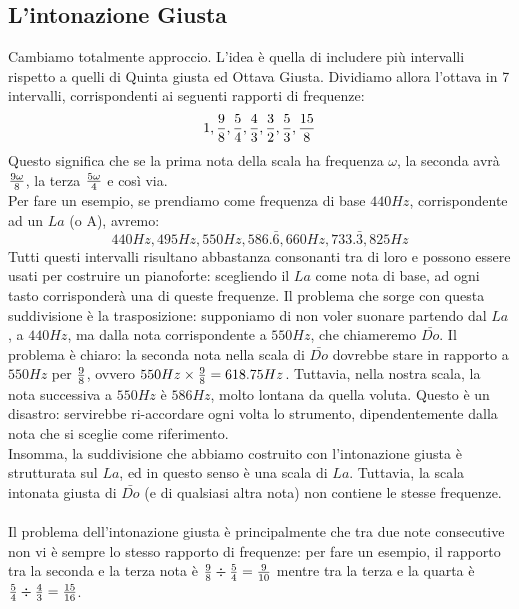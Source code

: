 \documentclass[12pt,a4paper]{report}
\theoremstyle{definition}
\theoremstyle{Theorem}
\theoremstyle{definition}
\theoremstyle{definition}
\theoremstyle{definition}
\begin{document}
	 \subsection{L'intonazione Giusta}
	 Cambiamo totalmente approccio. L'idea è quella di includere più intervalli rispetto a quelli di Quinta giusta ed Ottava Giusta. Dividiamo allora l'ottava in 7 intervalli, corrispondenti ai seguenti rapporti di frequenze:
	 $$1,{9\over8},{5\over4},{4\over3},{3\over 2},{5\over3},{15\over8}$$
	 Questo significa che se la prima nota della scala ha frequenza $\omega$, la seconda avrà $9\omega\over8$, la terza ${5\omega\over 4}$ e così via.\\
	 Per fare un esempio, se prendiamo come frequenza di base $440 Hz$, corrispondente ad un $La$ (o A), avremo:
	 $$440 Hz,495 Hz,550 Hz, 586.\bar{6},660 Hz,733.\bar{3},825 Hz$$
	 Tutti questi intervalli risultano abbastanza consonanti tra di loro e possono essere usati per costruire un pianoforte: scegliendo il $La$  come nota di base, ad ogni tasto corrisponderà una di queste frequenze.
	 Il problema che sorge con questa suddivisione è la trasposizione: supponiamo di non voler suonare partendo dal $La$, a $440 Hz$, ma dalla nota corrispondente a $550 Hz$, che chiameremo $\bar{Do}$. Il problema è chiaro: la seconda nota nella scala di $\bar{Do}$ dovrebbe stare in rapporto a $550 Hz$ per $9\over 8$, ovvero $550Hz\times {9\over 8}=618.75Hz$. Tuttavia, nella nostra scala, la nota successiva a $550 Hz$ è $586 Hz$, molto lontana da quella voluta. Questo è un disastro: servirebbe ri-accordare ogni volta lo strumento, dipendentemente dalla nota che si sceglie come riferimento.\\
	 Insomma, la suddivisione che abbiamo costruito con l'intonazione giusta è strutturata sul $La$, ed in questo senso è una scala di $La$. Tuttavia, la scala intonata giusta di $\bar{Do}$ (e di qualsiasi altra nota) non contiene le stesse frequenze.\\
	 \\ 
	 Il problema dell'intonazione giusta è principalmente che tra due note consecutive non vi è sempre lo stesso rapporto di frequenze: per fare un esempio, il rapporto tra la seconda e la terza nota è ${9\over 8}\div {5\over 4}={9\over 10}$ mentre tra la terza e la quarta è ${5\over 4}\div {4\over 3}= {15\over 16}$.
\end{document}
